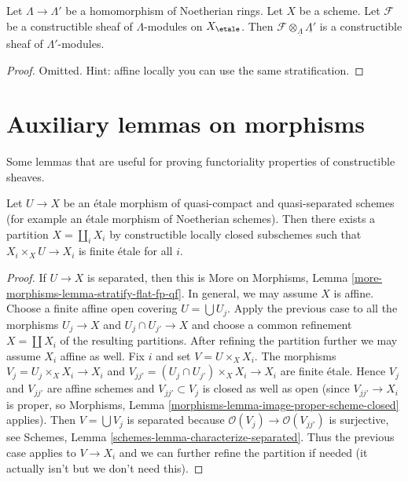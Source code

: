 \begin{lemma}
\label{lemma-tensor-constructible}
Let $\Lambda \to \Lambda'$ be a homomorphism of Noetherian rings.
Let $X$ be a scheme. Let $\mathcal{F}$ be a constructible
sheaf of $\Lambda$-modules on $X_\etale$. Then
$\mathcal{F} \otimes_{\underline{\Lambda}} \underline{\Lambda'}$
is a constructible sheaf of $\Lambda'$-modules.
\end{lemma}

\begin{proof}
Omitted. Hint: affine locally you can use the same stratification.
\end{proof}










\section{Auxiliary lemmas on morphisms}
\label{section-stratify-morphisms}

\noindent
Some lemmas that are useful for proving functoriality properties
of constructible sheaves.

\begin{lemma}
\label{lemma-etale-stratified-finite}
Let $U \to X$ be an \'etale morphism of quasi-compact and quasi-separated
schemes (for example an \'etale morphism of Noetherian schemes). Then there
exists a partition $X = \coprod_i X_i$ by constructible locally closed
subschemes such that $X_i \times_X U \to X_i$ is finite \'etale for all $i$.
\end{lemma}

\begin{proof}
If $U \to X$ is separated, then this is
More on Morphisms, Lemma \ref{more-morphisms-lemma-stratify-flat-fp-qf}.
In general, we may assume $X$ is affine. Choose a finite affine open
covering $U = \bigcup U_j$. Apply the previous case to all the morphisms
$U_j \to X$ and $U_j \cap U_{j'} \to X$ and choose a common
refinement $X = \coprod X_i$ of the resulting partitions.
After refining the partition further we may assume $X_i$ affine as well.
Fix $i$ and set $V = U \times_X X_i$. The morphisms
$V_j = U_j \times_X X_i \to X_i$ and
$V_{jj'} = (U_j \cap U_{j'}) \times_X X_i \to X_i$ are finite \'etale.
Hence $V_j$ and $V_{jj'}$ are affine schemes and $V_{jj'} \subset V_j$
is closed as well as open (since $V_{jj'} \to X_i$ is proper, so
Morphisms, Lemma \ref{morphisms-lemma-image-proper-scheme-closed}
applies). Then $V = \bigcup V_j$ is separated because
$\mathcal{O}(V_j) \to \mathcal{O}(V_{jj'})$ is surjective, see
Schemes, Lemma \ref{schemes-lemma-characterize-separated}.
Thus the previous case applies to $V \to X_i$ and we can further
refine the partition if needed (it actually isn't but we don't
need this).
\end{proof}

